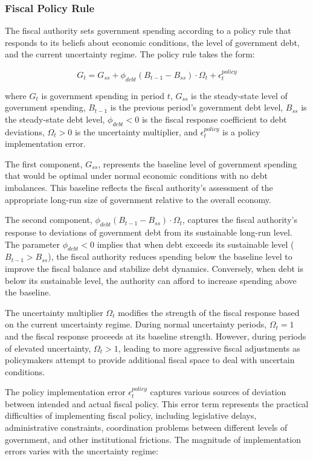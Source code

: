 \documentclass[5p,authoryear]{elsarticle}
\begin{document}
\subsubsection{Fiscal Policy Rule}

The fiscal authority sets government spending according to a policy rule that responds to its beliefs about economic conditions, the level of government debt, and the current uncertainty regime. The policy rule takes the form:

\begin{equation}
G_t = G_{ss} + \phi_{debt} (B_{t-1} - B_{ss}) \cdot \Omega_t + \epsilon_t^{policy}
\label{eq:fiscal_rule}
\end{equation}

where $G_t$ is government spending in period $t$, $G_{ss}$ is the steady-state level of government spending, $B_{t-1}$ is the previous period's government debt level, $B_{ss}$ is the steady-state debt level, $\phi_{debt} < 0$ is the fiscal response coefficient to debt deviations, $\Omega_t > 0$ is the uncertainty multiplier, and $\epsilon_t^{policy}$ is a policy implementation error.

The first component, $G_{ss}$, represents the baseline level of government spending that would be optimal under normal economic conditions with no debt imbalances. This baseline reflects the fiscal authority's assessment of the appropriate long-run size of government relative to the overall economy.

The second component, $\phi_{debt} (B_{t-1} - B_{ss}) \cdot \Omega_t$, captures the fiscal authority's response to deviations of government debt from its sustainable long-run level. The parameter $\phi_{debt} < 0$ implies that when debt exceeds its sustainable level ($B_{t-1} > B_{ss}$), the fiscal authority reduces spending below the baseline level to improve the fiscal balance and stabilize debt dynamics. Conversely, when debt is below its sustainable level, the authority can afford to increase spending above the baseline.

The uncertainty multiplier $\Omega_t$ modifies the strength of the fiscal response based on the current uncertainty regime. During normal uncertainty periods, $\Omega_t = 1$ and the fiscal response proceeds at its baseline strength. However, during periods of elevated uncertainty, $\Omega_t > 1$, leading to more aggressive fiscal adjustments as policymakers attempt to provide additional fiscal space to deal with uncertain conditions.

The policy implementation error $\epsilon_t^{policy}$ captures various sources of deviation between intended and actual fiscal policy. This error term represents the practical difficulties of implementing fiscal policy, including legislative delays, administrative constraints, coordination problems between different levels of government, and other institutional frictions. The magnitude of implementation errors varies with the uncertainty regime:
\end{document}
